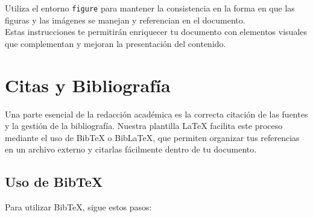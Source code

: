 \documentclass[11pt]{article}
\begin{document}
Utiliza el entorno \texttt{figure} para mantener la consistencia en la forma en que las figuras y las imágenes se manejan y referencian en el documento.\\

Estas instrucciones te permitirán enriquecer tu documento con elementos visuales que complementan y mejoran la presentación del contenido.


\section{Citas y Bibliografía}

Una parte esencial de la redacción académica es la correcta citación de las fuentes y la gestión de la bibliografía. Nuestra plantilla LaTeX facilita este proceso mediante el uso de BibTeX o BibLaTeX, que permiten organizar tus referencias en un archivo externo y citarlas fácilmente dentro de tu documento.

\subsection{Uso de BibTeX}

Para utilizar BibTeX, sigue estos pasos:
\end{document}

